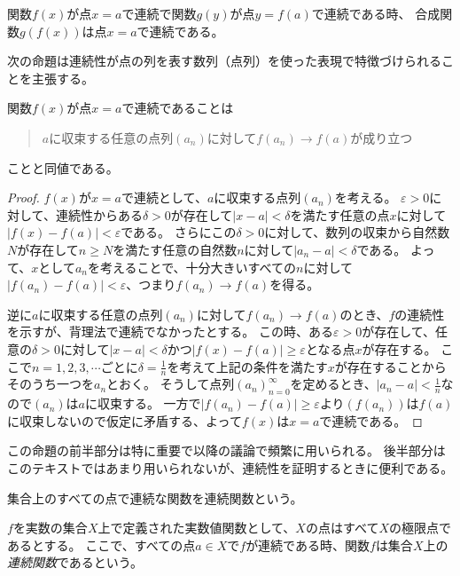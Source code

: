 \begin{proposition}[連続と合成関数]
関数$f(x)$が点$x = a$で連続で関数$g(y)$が点$y = f(a)$で連続である時、
合成関数$g(f(x))$は点$x = a$で連続である。
\end{proposition}

次の命題は連続性が点の列を表す数列（点列）を使った表現で特徴づけられることを主張する。

\begin{proposition}[点列連続性]
関数$f(x)$が点$x = a$で連続であることは
\begin{quote}
$a$に収束する任意の点列$(a_n)$に対して$f(a_n) \to f(a)$が成り立つ
\end{quote}
ことと同値である。
\end{proposition}

\begin{proof}
$f(x)$が$x = a$で連続として、$a$に収束する点列$(a_n)$を考える。
$\varepsilon > 0$に対して、連続性からある$\delta > 0$が存在して$|x-a| < \delta$を満たす任意の点$x$に対して$|f(x)-f(a)| < \varepsilon$である。
さらにこの$\delta > 0$に対して、数列の収束から自然数$N$が存在して$n \ge N$を満たす任意の自然数$n$に対して$|a_n-a| < \delta$である。
よって、$x$として$a_n$を考えることで、十分大きいすべての$n$に対して$|f(a_n)-f(a)| < \varepsilon$、つまり$f(a_n) \to f(a)$を得る。

逆に$a$に収束する任意の点列$(a_n)$に対して$f(a_n) \to f(a)$のとき、$f$の連続性を示すが、背理法で連続でなかったとする。
この時、ある$\varepsilon > 0$が存在して、任意の$\delta > 0$に対して$|x-a| < \delta$かつ$|f(x)-f(a)| \ge \varepsilon$となる点$x$が存在する。
ここで$n = 1, 2, 3, \cdots$ごとに$\delta = \frac{1}{n}$を考えて上記の条件を満たす$x$が存在することからそのうち一つを$a_n$とおく。
そうして点列$(a_n)_{n = 0}^\infty$を定めるとき、$|a_n-a| < \frac{1}{n}$なので$(a_n)$は$a$に収束する。
一方で$|f(a_n)-f(a)| \ge \varepsilon$より$(f(a_n))$は$f(a)$に収束しないので仮定に矛盾する、よって$f(x)$は$x = a$で連続である。
\end{proof}

この命題の前半部分は特に重要で以降の議論で頻繁に用いられる。
後半部分はこのテキストではあまり用いられないが、連続性を証明するときに便利である。

集合上のすべての点で連続な関数を連続関数という。

\begin{definition}[連続関数]
$f$を実数の集合$X$上で定義された実数値関数として、$X$の点はすべて$X$の極限点であるとする。
ここで、すべての点$a \in X$で$f$が連続である時、関数$f$は集合$X$上の\emph{連続関数}であるという。
\end{definition}


